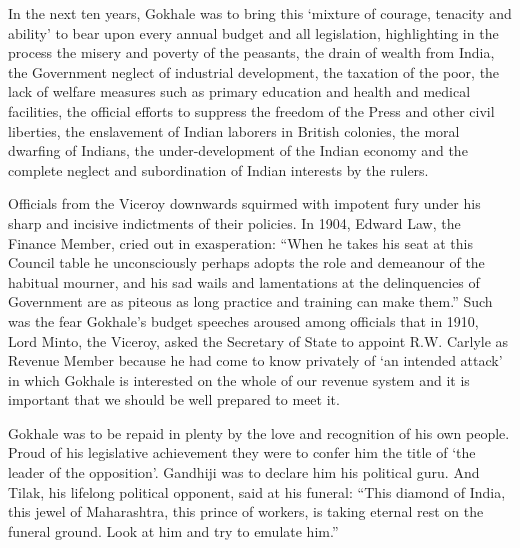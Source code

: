 In the next ten years, Gokhale was to bring this `mixture of courage, tenacity and ability' to bear upon every annual budget and all legislation, highlighting in the process the misery and poverty of the peasants, the drain of wealth from India, the Government neglect of industrial development, the taxation of the poor, the lack of welfare measures such as primary education and health and medical facilities, the official efforts to suppress the freedom of the Press and other civil liberties, the enslavement of Indian laborers in British colonies, the moral dwarfing of Indians, the under-development of the Indian economy and the complete neglect and subordination of Indian interests by the rulers.

Officials from the Viceroy downwards squirmed with impotent fury under his sharp and incisive indictments of their policies. In 1904, Edward Law, the Finance Member, cried out in exasperation: ``When he takes his seat at this Council table he unconsciously perhaps adopts the role and demeanour of the habitual mourner, and his sad wails and lamentations at the delinquencies of Government are as piteous as long practice and training can make them.'' Such was the fear Gokhale's budget speeches aroused among officials that in 1910, Lord Minto, the Viceroy, asked the Secretary of State to appoint R.W. Carlyle as Revenue Member because he had come to know privately of `an intended attack' in which Gokhale is interested on the whole of our revenue system and it is important that we should be well prepared to meet it.

Gokhale was to be repaid in plenty by the love and recognition of his own people. Proud of his legislative achievement they were to confer him the title of `the leader of the opposition'. Gandhiji was to declare him his political guru. And Tilak, his lifelong political opponent, said at his funeral: ``This diamond of India, this jewel of Maharashtra, this prince of workers, is taking eternal rest on the funeral ground. Look at him and try to emulate him.''
